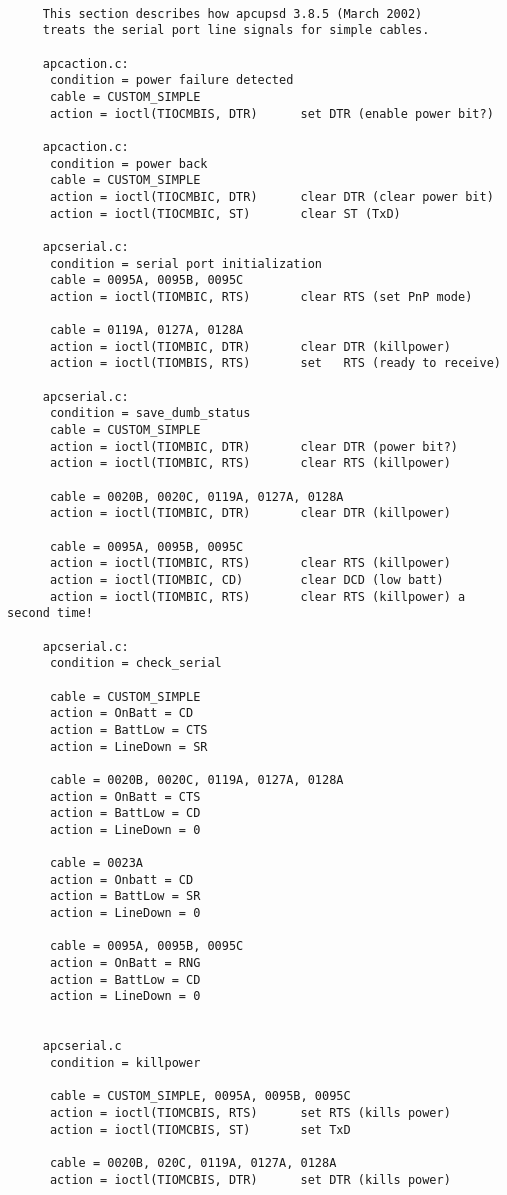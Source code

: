 \footnotesize
\begin{verbatim}
     
     This section describes how apcupsd 3.8.5 (March 2002)
     treats the serial port line signals for simple cables.
     
     apcaction.c:
      condition = power failure detected
      cable = CUSTOM_SIMPLE
      action = ioctl(TIOCMBIS, DTR)      set DTR (enable power bit?)
     
     apcaction.c:
      condition = power back
      cable = CUSTOM_SIMPLE
      action = ioctl(TIOCMBIC, DTR)      clear DTR (clear power bit)
      action = ioctl(TIOCMBIC, ST)       clear ST (TxD)
     
     apcserial.c:
      condition = serial port initialization
      cable = 0095A, 0095B, 0095C
      action = ioctl(TIOMBIC, RTS)       clear RTS (set PnP mode)
     
      cable = 0119A, 0127A, 0128A
      action = ioctl(TIOMBIC, DTR)       clear DTR (killpower)
      action = ioctl(TIOMBIS, RTS)       set   RTS (ready to receive)
     
     apcserial.c:
      condition = save_dumb_status
      cable = CUSTOM_SIMPLE
      action = ioctl(TIOMBIC, DTR)       clear DTR (power bit?)
      action = ioctl(TIOMBIC, RTS)       clear RTS (killpower)
     
      cable = 0020B, 0020C, 0119A, 0127A, 0128A
      action = ioctl(TIOMBIC, DTR)       clear DTR (killpower)
     
      cable = 0095A, 0095B, 0095C
      action = ioctl(TIOMBIC, RTS)       clear RTS (killpower)
      action = ioctl(TIOMBIC, CD)        clear DCD (low batt)
      action = ioctl(TIOMBIC, RTS)       clear RTS (killpower) a second time!
     
     apcserial.c:
      condition = check_serial
     
      cable = CUSTOM_SIMPLE
      action = OnBatt = CD
      action = BattLow = CTS
      action = LineDown = SR
     
      cable = 0020B, 0020C, 0119A, 0127A, 0128A
      action = OnBatt = CTS
      action = BattLow = CD
      action = LineDown = 0
     
      cable = 0023A
      action = Onbatt = CD
      action = BattLow = SR
      action = LineDown = 0
     
      cable = 0095A, 0095B, 0095C
      action = OnBatt = RNG
      action = BattLow = CD
      action = LineDown = 0
     
     
     apcserial.c
      condition = killpower
     
      cable = CUSTOM_SIMPLE, 0095A, 0095B, 0095C
      action = ioctl(TIOMCBIS, RTS)      set RTS (kills power)
      action = ioctl(TIOMCBIS, ST)       set TxD
     
      cable = 0020B, 020C, 0119A, 0127A, 0128A
      action = ioctl(TIOMCBIS, DTR)      set DTR (kills power)
     
\end{verbatim}
\normalsize

